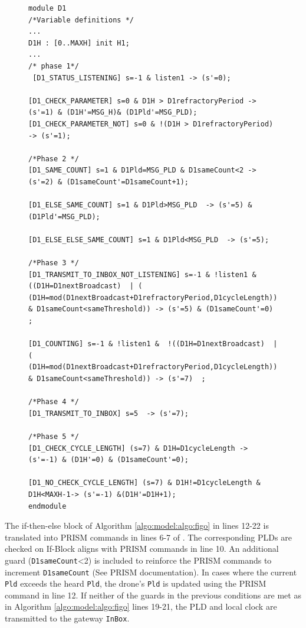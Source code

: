 \begin{figure}[!htb]            
\begin{minipage}{16.5cm}
\begin{lstlisting}[style=framed,%customc,
	caption=PRISM Code for Drone Module,
 	label=exchangemodel]	
module D1
/*Variable definitions */
...
D1H : [0..MAXH] init H1;
...
/* phase 1*/ 
 [D1_STATUS_LISTENING] s=-1 & listen1 -> (s'=0);
 
[D1_CHECK_PARAMETER] s=0 & D1H > D1refractoryPeriod -> (s'=1) & (D1H'=MSG_H)& (D1Pld'=MSG_PLD);
[D1_CHECK_PARAMETER_NOT] s=0 & !(D1H > D1refractoryPeriod) -> (s'=1);

/*Phase 2 */
[D1_SAME_COUNT] s=1 & D1Pld=MSG_PLD & D1sameCount<2 -> (s'=2) & (D1sameCount'=D1sameCount+1);

[D1_ELSE_SAME_COUNT] s=1 & D1Pld>MSG_PLD  -> (s'=5) & (D1Pld'=MSG_PLD);

[D1_ELSE_ELSE_SAME_COUNT] s=1 & D1Pld<MSG_PLD  -> (s'=5);

/*Phase 3 */
[D1_TRANSMIT_TO_INBOX_NOT_LISTENING] s=-1 & !listen1 &  ((D1H=D1nextBroadcast)  | ( (D1H=mod(D1nextBroadcast+D1refractoryPeriod,D1cycleLength)) & D1sameCount<sameThreshold)) -> (s'=5) & (D1sameCount'=0) ;

[D1_COUNTING] s=-1 & !listen1 &  !((D1H=D1nextBroadcast)  | ( (D1H=mod(D1nextBroadcast+D1refractoryPeriod,D1cycleLength)) & D1sameCount<sameThreshold)) -> (s'=7)  ;

/*Phase 4 */
[D1_TRANSMIT_TO_INBOX] s=5  -> (s'=7);

/*Phase 5 */
[D1_CHECK_CYCLE_LENGTH] (s=7) & D1H=D1cycleLength -> (s'=-1) & (D1H'=0) & (D1sameCount'=0);

[D1_NO_CHECK_CYCLE_LENGTH] (s=7) & D1H!=D1cycleLength & D1H<MAXH-1-> (s'=-1) &(D1H'=D1H+1);
endmodule
\end{lstlisting}
 \end{minipage}  
\end{figure}

The if-then-else block of Algorithm \ref{algo:model:algo:figo} in lines 12-22 is translated into PRISM commands in lines 6-7 of . The corresponding PLDs are checked on If-Block aligns with PRISM commands in line 10. An additional guard (\texttt{D1sameCount}<2) is included to reinforce the PRISM commands to increment \texttt{D1sameCount} (See PRISM documentation). In cases where the current \texttt{Pld} exceeds the heard \texttt{Pld}, the drone's \texttt{Pld} is updated using the PRISM command in line 12. If neither of the guards in the previous conditions are met as in Algorithm \ref{algo:model:algo:figo} lines 19-21, the PLD and local clock are transmitted to the gateway \texttt{InBox}.

